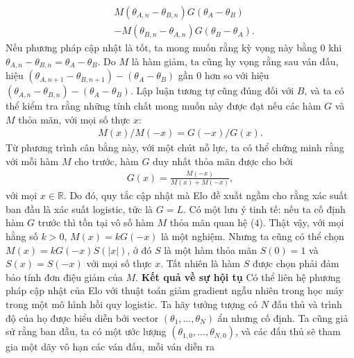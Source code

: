 \begin{multicols}{2}
	\begin{align*}
		&M(\theta_{A, n} - \theta_{B, n}) G(\theta_A - \theta_B)\\
		 &- M(\theta_{B, n} - \theta_{A, n}) G(\theta_B - \theta_A).
	\end{align*}
	Nếu phương pháp cập nhật là tốt, ta mong muốn rằng kỳ vọng này bằng $0$ khi $\theta_{A, n} - \theta_{B, n} = \theta_A - \theta_B$. Do $M$ là hàm giảm, ta cũng hy vọng rằng sau ván đấu, hiệu $(\theta_{A, n + 1} - \theta_{B, n + 1}) - (\theta_A - \theta_B)$ gần $0$ hơn so với hiệu $(\theta_{A, n} - \theta_{B, n}) - (\theta_A - \theta_B)$.
	\vskip 0.01cm
	Lập luận tương tự cũng đúng đối với $B$, và ta có thể kiểm tra rằng những tính chất mong muốn này được đạt nếu các hàm $G$ và $M$ thỏa mãn, với mọi số thực $x$:
	\begin{align*}
		M(x) / M(-x) = G(-x) / G(x). \tag{$4$}
	\end{align*}
	Từ phương trình cân bằng này, với một chút nỗ lực, ta có thể chứng minh rằng với mỗi hàm $M$ cho trước, hàm $G$ duy nhất thỏa mãn được cho bởi
	\begin{align*}
		G(x) = \frac { M(-x) }{ M(x) + M(-x) },
	\end{align*}
	với mọi $x \in \mathbb R$.
	\vskip 0.01cm
	Do đó, quy tắc cập nhật mà Elo đề xuất ngầm cho rằng xác suất ban đầu là xác suất logistic, tức là $G = L$.
	\vskip 0.01cm
	Có một lưu ý tinh tế: nếu ta cố định hàm $G$ trước thì tồn tại vô số hàm $M$ thỏa mãn quan hệ ($4$). Thật vậy, với mọi hằng số $k > 0$, $M(x) = k G(-x)$ là một nghiệm. Nhưng ta cũng có thể chọn $M(x) = k G(-x) S(|x|)$, ở đó $S$ là một hàm thỏa mãn $S(0) = 1$ và $S(x) = S(-x)$ với mọi số thực $x$. Tất nhiên là hàm $S$ được chọn phải đảm bảo tính đơn điệu giảm của $M$.
	\vskip 0.05cm
	\textbf{\color{toanhocdoisong}Kết quả về sự hội tụ}
	\vskip 0.05cm
	Có thể liên hệ phương pháp cập nhật của Elo với thuật toán giảm gradient ngẫu nhiên trong học máy trong một mô hình hồi quy logistic.
	\vskip 0.05cm
	Ta hãy tưởng tượng có $N$ đấu thủ và trình độ của họ được biểu diễn bởi vector $(\theta_1, \dots, \theta_N)$ ẩn nhưng cố định. Ta cũng giả sử rằng ban đầu, ta có một ước lượng $(\theta_{1, 0}, \dots, \theta_{N, 0})$, và các đấu thủ sẽ tham gia một dãy vô hạn các ván đấu, mỗi ván diễn ra 
	\end{multicols}
	\vspace*{-8pt}
